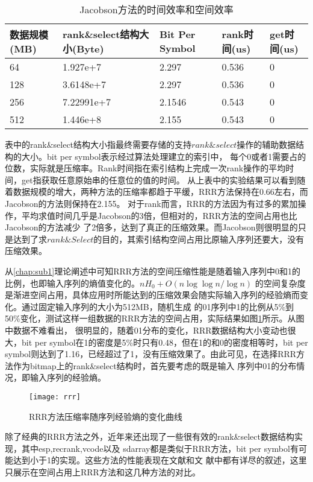 \begin{table}[htbp]
    \caption{Jacobson方法的时间效率和空间效率}
    \label{tab:tabjacobson}
    \centering
    \begin{tabularx}{1.0\textwidth}{lXlll}
        \toprule
        数据规模(MB)&rank\&select结构大小(Byte)&Bit Per Symbol&rank时间(us)&get时间(us)\\
        \midrule
        64&1.927e+7&2.297&0.536&0\\
        128&3.6148e+7&2.297&0.536&0\\
        256&7.22991e+7&2.1546&0.543&0\\
        512&1.446e+8&2.155&0.543&0\\
        \bottomrule
    \end{tabularx}
\end{table}

表中的rank\&select结构大小指最终需要存储的支持$rank\&select$操作的辅助数据结构的大小。bit per symbol表示经过算法处理建立的索引中，
每个0或者1需要占的位数，实际就是压缩率。Rank时间指在索引结构上完成一次rank操作的平均时间，get指获取任意原始串的任意位的值的时间。
从上表中的实验结果可以看到随着数据规模的增大，两种方法的压缩率都趋于平缓，RRR方法保持在0.66左右，而Jacobson的方法则保持在2.155。
对于rank而言，RRR的方法因为有过多的累加操作，平均求值时间几乎是Jacobson的3倍，但相对的，RRR方法的空间占用也比Jacobson的方法减少
了2倍多，达到了真正的压缩效果。而Jacobson则很明显的只是达到了求$rank\&Select$的目的，其索引结构空间占用比原输入序列还要大，没有
压缩效果。

从\ref{chap:sub1}理论阐述中可知RRR方法的空间压缩性能是随着输入序列中0和1的比例，也即输入序列的熵值变化的。$nH_0 + O(n\log\log n/\log n)$
的空间复杂度是渐进空间占用，具体应用时所能达到的压缩效果会随实际输入序列的经验熵而变化。通过固定输入序列的大小为512MB，随机生成
的01序列中1的比例从5\%到50\%变化，测试这样一组数据的RRR方法的空间占用，实际结果如图\ref{fig:figrrr}所示。从图中数据不难看出，
很明显的，随着01分布的变化，RRR数据结构大小变动也很大，bit per symbol在1的密度是5\%时只有0.48，但在1的和0的密度相等时，bit per
symbol则达到了1.16，已经超过了1，没有压缩效果了。由此可见，在选择RRR方法作为bitmap上的rank\&select结构时，首先要考虑的既是输入
序列中01的分布情况，即输入序列的经验熵。


\begin{figure}[t]
    \label{fig:figrrr}
    \centering
    \texttt{[image: rrr]}
    \caption{RRR方法压缩率随序列经验熵的变化曲线}
\end{figure}


除了经典的RRR方法之外，近年来还出现了一些很有效的rank\&select数据结构实现\cite{okanohara2007practical}，其中esp,recrank,vcode以及
sdarray都是类似于RRR方法，bit per symbol有可能达到小于1的实现。这些方法的性能表现在文献\cite{claude2009practical}和文
献\cite{okanohara2007practical}中都有详尽的叙述，这里只展示在空间占用上RRR方法和这几种方法的对比。

